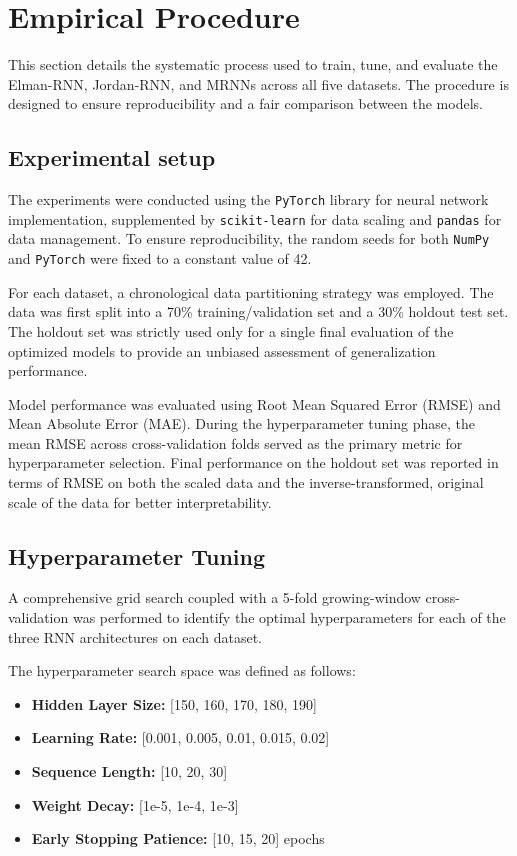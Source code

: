 \documentclass[conference, 10pt]{IEEEtran}
\begin{document}
\section{Empirical Procedure}
This section details the systematic process used to train, tune, and evaluate the Elman-RNN, Jordan-RNN, and MRNNs across all
five datasets. The procedure is designed to ensure reproducibility and a fair comparison between the models.

\subsection{Experimental setup}
The experiments were conducted using the \texttt{PyTorch} library for neural network implementation, supplemented by \texttt{scikit-learn}
for data scaling and \texttt{pandas} for data management. To ensure reproducibility, the random seeds for both \texttt{NumPy} and \texttt{PyTorch}
were fixed to a constant value of 42.

For each dataset, a chronological data partitioning strategy was employed. The data was first split into a 70\%
training/validation set and a 30\% holdout test set. The holdout set was strictly used only for a single final evaluation
of the optimized models to provide an unbiased assessment of generalization performance.

Model performance was evaluated using Root Mean Squared Error (RMSE) and Mean Absolute Error (MAE). During the
hyperparameter tuning phase, the mean RMSE across cross-validation folds served as the primary metric for hyperparameter
selection. Final performance on the holdout set was reported in terms of RMSE on both the scaled data and the
inverse-transformed, original scale of the data for better interpretability.

\subsection{Hyperparameter Tuning}
A comprehensive grid search coupled with a 5-fold growing-window cross-validation was performed to identify the optimal
hyperparameters for each of the three RNN architectures on each dataset.

The hyperparameter search space was defined as follows:
\begin{itemize}
    \item \textbf{Hidden Layer Size:} [150, 160, 170, 180, 190]
    \item \textbf{Learning Rate:} [0.001, 0.005, 0.01, 0.015, 0.02]
    \item \textbf{Sequence Length:} [10, 20, 30]
    \item \textbf{Weight Decay:} [1e-5, 1e-4, 1e-3]
    \item \textbf{Early Stopping Patience:} [10, 15, 20] epochs
\end{itemize}
\end{document}
